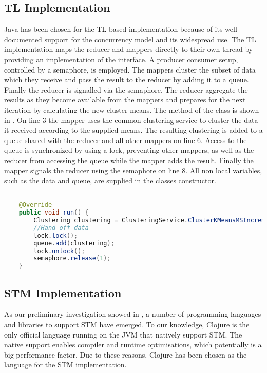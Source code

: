 \subsection{\ac{TL} Implementation}
Java has been chosen for the \ac{TL} based implementation because of its well documented support for the concurrency model and its widespread use. The \ac{TL} implementation maps the reducer and mappers directly to their own thread by providing an implementation of the  interface. A producer consumer setup, controlled by a semaphore, is employed. The mappers cluster the subset of data which they receive and pass the result to the reducer by adding it to a queue. Finally the reducer is signalled via the semaphore. The reducer aggregate the results as they become available from the mappers  and prepares for the next iteration by calculating the new cluster means. The  method of the  class is shown in . On line 3 the mapper uses the common clustering service to cluster the data it received according to the supplied means. The resulting clustering is added to a queue shared with the reducer and all other mappers on line 6. Access to the queue is synchronized by using a lock, preventing other mappers, as well as the reducer from accessing the queue while the mapper adds the result. Finally the mapper signals the reducer using the semaphore on line 8. All non local variables, such as the data and queue, are supplied in the  classes constructor.

\begin{lstlisting}[float,label=lst:tl_implementation,
  caption={\ac{TL} Implementation},
  language=Java,  
  showspaces=false,
  showtabs=false,
  breaklines=true,
  showstringspaces=false,
  breakatwhitespace=true,
  commentstyle=\color{greencomments},
  keywordstyle=\color{bluekeywords},
  stringstyle=\color{redstrings}]  % Start your code-block

    @Override
    public void run() {
        Clustering clustering = ClusteringService.ClusterKMeansMSIncremental(data, means);
        //Hand off data
        lock.lock();
        queue.add(clustering);
        lock.unlock();
        semaphore.release(1);
    }  
\end{lstlisting}

\subsection{\ac{STM} Implementation}
As our preliminary investigation showed in , a number of programming languages and libraries to support \ac{STM} have emerged. To our knowledge, Clojure is the only official language running on the \ac{JVM} that natively support \ac{STM}. The native support enables compiler and runtime optimisations, which potentially is a big performance factor. Due to these reasons, Clojure has been chosen as the language for the \ac{STM} implementation.

